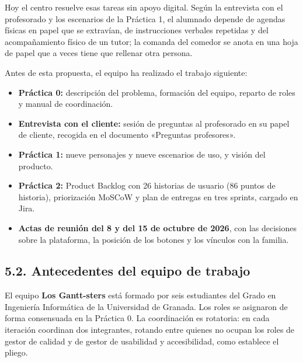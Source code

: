 \documentclass[11pt,a4paper]{article}
\newcommand{\hl}[1]{\textcolor{gblue}{\textbf{#1}}}
\begin{document}
Hoy el centro resuelve esas tareas sin apoyo digital. Según la entrevista con el profesorado y los escenarios de la Práctica 1, el alumnado depende de agendas físicas en papel que se extravían, de instrucciones verbales repetidas y del acompañamiento físico de un tutor; la comanda del comedor se anota en una hoja de papel que a veces tiene que rellenar otra persona.

Antes de esta propuesta, el equipo ha realizado el trabajo siguiente:

\begin{itemize}
\item \hl{Práctica 0:} descripción del problema, formación del equipo, reparto de roles y manual de coordinación.
\item \hl{Entrevista con el cliente:} sesión de preguntas al profesorado en su papel de cliente, recogida en el documento «Preguntas profesores».
\item \hl{Práctica 1:} nueve personajes y nueve escenarios de uso, y visión del producto.
\item \hl{Práctica 2:} Product Backlog con 26 historias de usuario (86 puntos de historia), priorización MoSCoW y plan de entregas en tres sprints, cargado en Jira.
\item \hl{Actas de reunión del 8 y del 15 de octubre de 2026}, con las decisiones sobre la plataforma, la posición de los botones y los vínculos con la familia.
\end{itemize}
\subsection*{5.2. Antecedentes del equipo de trabajo}
El equipo \hl{Los Gantt-sters} está formado por seis estudiantes del Grado en Ingeniería Informática de la Universidad de Granada. Los roles se asignaron de forma consensuada en la Práctica 0. La coordinación es rotatoria: en cada iteración coordinan dos integrantes, rotando entre quienes no ocupan los roles de gestor de calidad y de gestor de usabilidad y accesibilidad, como establece el pliego.
\end{document}

